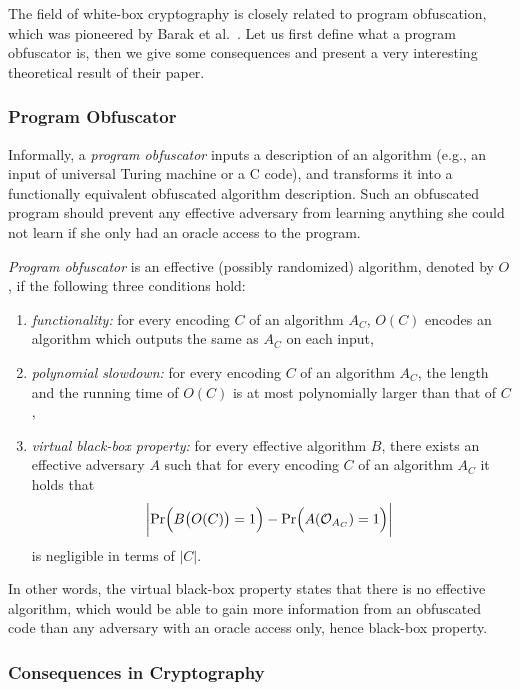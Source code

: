 The field of white-box cryptography is closely related to program obfuscation, which was pioneered by Barak et al.\ \cite{barak2001possibility}. Let us first define what a program obfuscator is, then we give some consequences and present a very interesting theoretical result of their paper.

\subsubsection{Program Obfuscator}
	
	Informally, a {\em program obfuscator} inputs a description of an algorithm (e.g., an input of universal Turing machine or a C code), and transforms it into a functionally equivalent obfuscated algorithm description. Such an obfuscated program should prevent any effective adversary from learning anything she could not learn if she only had an oracle access to the program.
	
	\begin{defn}
	\label{def:obfus}
		{\em Program obfuscator} is an effective (possibly randomized) algorithm, denoted by $O$, if the following three conditions hold:
		\begin{enumerate}
			\item {\em functionality:} for every encoding $C$ of an algorithm $A_C$, $O(C)$ encodes an algorithm which outputs the same as $A_C$ on each input,
			\item {\em polynomial slowdown:} for every encoding $C$ of an algorithm $A_C$, the length and the running time of $O(C)$ is at most polynomially larger than that of $C$,
			\item {\em virtual black-box property:} for every effective algorithm $B$, there exists an effective adversary $A$ such that for every encoding $C$ of an algorithm $A_C$ it holds that
			\[
				\biggl| \Pr\Bigl(B\bigl(O(C)\bigr)=1\Bigr) - \Pr\Bigl(A({\cal O}_{A_C})=1\Bigr) \biggr| \
			\]
			is negligible in terms of $|C|$.
		\end{enumerate}
	\end{defn}
	
	In other words, the virtual black-box property states that there is no effective algorithm, which would be able to gain more information from an obfuscated code than any adversary with an oracle access only, hence black-box property.

\subsubsection{Consequences in Cryptography}
	
